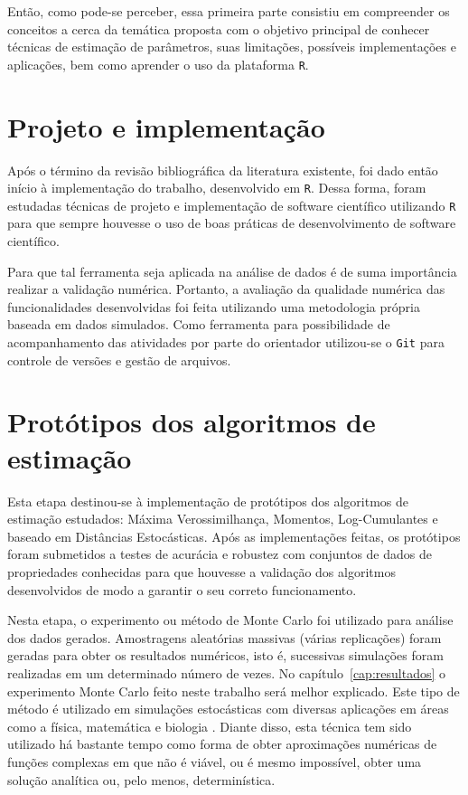 Então, como pode-se perceber, essa primeira parte consistiu em compreender os conceitos a cerca da temática proposta com o objetivo principal de conhecer técnicas de estimação de parâmetros, suas limitações, possíveis implementações e aplicações, bem como aprender o uso da plataforma \texttt{R}.

\section{Projeto e implementação}

Após o término da revisão bibliográfica da literatura existente, foi dado então início à implementação do trabalho, desenvolvido em \texttt{R}. Dessa forma, foram estudadas técnicas de projeto e implementação de software científico utilizando \texttt{R} para que sempre houvesse o uso de boas práticas de desenvolvimento de software científico.

Para que tal ferramenta seja aplicada na análise de dados é de suma importância realizar a validação numérica. Portanto, a avaliação da qualidade numérica das funcionalidades desenvolvidas foi feita utilizando uma metodologia própria baseada em dados simulados. Como ferramenta para possibilidade de acompanhamento das atividades por parte do orientador utilizou-se o \texttt{Git} para controle de versões e gestão de arquivos.

\section{Protótipos dos algoritmos de estimação}

Esta etapa destinou-se à implementação de protótipos dos algoritmos de estimação estudados: Máxima Verossimilhança, Momentos, Log-Cumulantes e baseado em Distâncias Estocásticas. Após as implementações feitas, os protótipos foram submetidos a testes de acurácia e robustez com conjuntos de dados de propriedades conhecidas para que houvesse a validação dos algoritmos desenvolvidos de modo a garantir o seu correto funcionamento.

Nesta etapa, o experimento ou método de Monte Carlo foi utilizado para análise dos dados gerados. Amostragens aleatórias massivas (várias replicações) foram geradas para obter os resultados numéricos, isto é, sucessivas simulações foram realizadas em um determinado número de vezes. 
No capítulo~\ref{cap:resultados} o experimento Monte Carlo feito neste trabalho será melhor explicado. Este tipo de método é utilizado em simulações estocásticas com diversas aplicações em áreas como a física, matemática e biologia \citep{busto92}. Diante disso, esta técnica tem sido utilizado há bastante tempo como forma de obter aproximações numéricas de funções complexas em que não é viável, ou é mesmo impossível, obter uma solução analítica ou, pelo menos, determinística.

